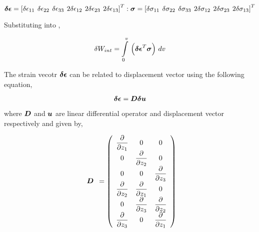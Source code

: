 \begin{equation}
  \vect{\delta \epsilon}=\transpose{\sqbrac{\delta \epsilon_{11} \hspace{4 pt} \delta \epsilon_{22} \hspace{4 pt} \delta \epsilon_{33} 
                         \hspace{4 pt} 2\delta \epsilon_{12} \hspace{4 pt} 2\delta \epsilon_{23} \hspace{4 pt} 2\delta \epsilon_{13}}} :
	       	         \vect{\sigma}=\transpose{\sqbrac{\delta \sigma_{11} \hspace{4 pt} \delta \sigma_{22} \hspace{4 pt} \delta \sigma_{33} 
		         \hspace{4 pt} 2\delta \sigma_{12} \hspace{4 pt} 2\delta \sigma_{23} \hspace{4 pt} 2\delta \sigma_{13} }}	  		  
  \label{eqn:newvectors}
\end{equation} 

Substituting  into ,

\begin{equation}
  \delta W_{int}=\gint{0}{v}{\pbrac{\transpose{\vect{\delta \epsilon}} \vect{\sigma}}}v
  \label{eqn:virtualenergy1}
\end{equation}

The strain vecotr $\vect{\delta \epsilon}$ can be related to displacement vector using the following equation,

\begin{equation}
  \vect{\delta \epsilon}=\matr{D} \vect{\delta u} 
  \label{eqn:virtualsmalldisplacement1}
\end{equation}

\noindent where $\matr{D}$ and $\vect{u}$ are linear differential operator and displacement vector respectively and given by,

\begin{equation}
  \begin{array}{c} \matr{D} \end{array} =
  \pbrac{ \begin{array}{ccc} \delby{}{z_{1}} & 0 & 0 \\ 
                             0 & \delby{}{z_{2}} & 0 \\
			     0 & 0 & \delby{}{z_{3}} \\
			     \delby{}{z_{2}} & \delby{}{z_{1}} & 0 \\ 
			     0 & \delby{}{z_{3}} & \delby{}{z_{2}} \\ 
			     \delby{}{z_{3}} & 0 & \delby{}{z_{1}} \\ \end{array} }
  \label{eqn:differentialoperator}
\end{equation}

